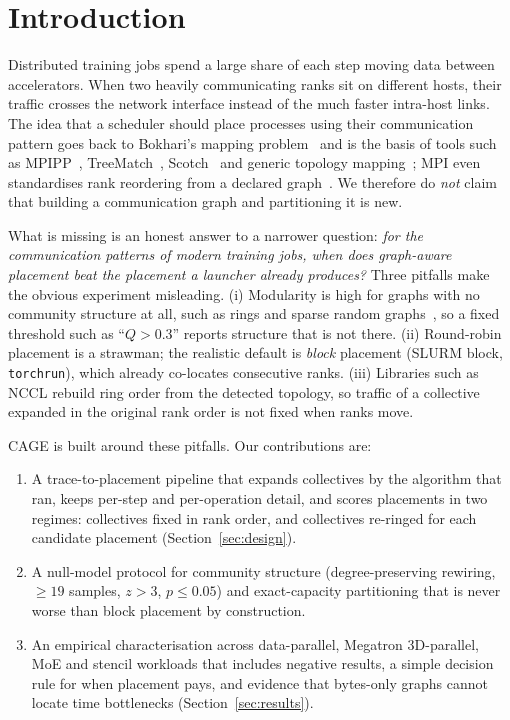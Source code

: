 \documentclass[conference]{IEEEtran}
\begin{document}
\section{Introduction}

Distributed training jobs spend a large share of each step moving data between accelerators.
When two heavily communicating ranks sit on different hosts, their traffic crosses the network
interface instead of the much faster intra-host links. The idea that a scheduler should place
processes using their communication pattern goes back to Bokhari's mapping
problem~\cite{bokhari1981mapping} and is the basis of tools such as MPIPP~\cite{chen2006mpipp},
TreeMatch~\cite{jeannot2014treematch}, Scotch~\cite{pellegrini1996scotch} and generic topology
mapping~\cite{hoefler2011generic}; MPI even standardises rank reordering from a declared
graph~\cite{traff2002topology,mpi40}. We therefore do \emph{not} claim that building a
communication graph and partitioning it is new.

What is missing is an honest answer to a narrower question: \emph{for the communication patterns
of modern training jobs, when does graph-aware placement beat the placement a launcher already
produces?} Three pitfalls make the obvious experiment misleading. (i) Modularity is high for
graphs with no community structure at all, such as rings and sparse random
graphs~\cite{guimera2004modularity}, so a fixed threshold such as ``$Q>0.3$'' reports structure that
is not there. (ii) Round-robin placement is a strawman; the realistic default is \emph{block}
placement (SLURM block, \texttt{torchrun}), which already co-locates consecutive ranks.
(iii) Libraries such as NCCL rebuild ring order from the detected topology, so traffic of a
collective expanded in the original rank order is not fixed when ranks move.

CAGE is built around these pitfalls. Our contributions are:
\begin{enumerate}
\item A trace-to-placement pipeline that expands collectives by the algorithm that ran, keeps
      per-step and per-operation detail, and scores placements in two regimes: collectives
      fixed in rank order, and collectives re-ringed for each candidate placement
      (Section~\ref{sec:design}).
\item A null-model protocol for community structure (degree-preserving rewiring, $\geq 19$
      samples, $z>3$, $p\leq 0.05$) and exact-capacity partitioning that is never worse than
      block placement by construction.
\item An empirical characterisation across data-parallel, Megatron 3D-parallel, MoE and stencil
      workloads that includes negative results, a simple decision rule for when placement pays,
      and evidence that bytes-only graphs cannot locate time bottlenecks (Section~\ref{sec:results}).
\end{enumerate}
\end{document}
